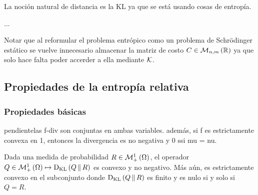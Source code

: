 La noción natural de distancia es la KL ya que se está usando cosas de entropía.

...

Notar que al reformular el problema entrópico como un problema de Schrödinger estático se vuelve innecesario almacenar la matriz de costo $C\in\mathcal{M}_{n,m}\left(\mathbb{R}\right)$ ya que solo hace falta poder accerder a ella mediante $\mathcal{K}$.

\subsection{Propiedades de la entropía relativa}
\label{eot_sbp/static_sbp/entropy_properties}

\subsubsection{Propiedades básicas}

pendiente{las f-div son conjuntas en ambas variables. además, si f es estrictamente convexa en 1, entonces la divergencia es no negativa y 0 ssi mu = nu.}

\begin{prop}
	\label{prop:kl_convexity}
	Dada una medida de probabilidad $R\in\mathcal{M}_+^1\left(\Omega\right)$, el operador $Q\in\mathcal{M}_+^1\left(\Omega\right) \mapsto \operatorname{D_{KL}}\left(Q\,\|\,R\right)$ es convexo y no negativo. Más aún, es estrictamente convexo en el subconjunto donde $\operatorname{D_{KL}}\left(Q\,\|\,R\right)$ es finito y es nulo si y solo si $Q=R$.

\end{prop}






